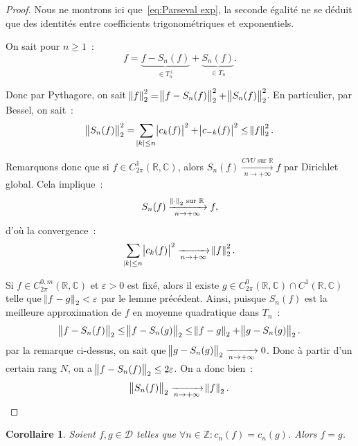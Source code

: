 \documentclass{report}
\newtheorem{cor}[thm]{Corollaire}
\theoremstyle{definition}
\theoremstyle{remark}
\numberwithin{equation}{section}
\newcommand{\C}{\mathbb C}
\newcommand{\R}{\mathbb R}
\newcommand{\Z}{\mathbb Z}
\newcommand{\CONV}[5]{\xrightarrow[#2 \to #3]{#4 \text{ #5 } #1}}
\newcommand{\CVU}[3]{\CONV{#1}{#2}{#3}{CVU}{sur}}
\newcommand{\pinfty}{{+\infty}}
\newcommand{\CmT}[2]{C^{#1,m}_{#2}}
\newcommand{\CzmT}[1]{\CmT 0{#1}}
\newcommand{\Czm}{\CzmT{2\pi}}
\begin{document}
			\begin{proof} Nous ne montrons ici que~\eqref{eq:Parseval exp}, la seconde égalité ne se déduit que des identités entre coefficients trigonométriques
			et exponentiels.

			On sait pour $n \geq 1$~:
			\begin{equation}
				f = \underbrace {f-S_n(f)}_{\in T_n^\perp} + \underbrace {S_n(f)}_{\in T_n}.
			\end{equation}

			Donc par Pythagore, on sait $\norm f_2^2 = \norm {f-S_n(f)}_2^2 + \norm {S_n(f)}_2^2$. En particulier, par Bessel, on sait~:
			\begin{equation}
				\norm {S_n(f)}_2^2 = \sum_{\abs k \leq n}\abs {c_k(f)}^2 + \abs {c_{-k}(f)}^2 \leq \norm f_2^2.
			\end{equation}

			Remarquons donc que si $f \in C^1_{2\pi}(\R, \C)$, alors $S_n(f) \CVU \R n\pinfty f$ par Dirichlet global. Cela implique~:
			\begin{equation}
				S_n(f) \xrightarrow[n \to \pinfty]{\norm \cdot_2 \text{ sur } \R} f,
			\end{equation}
			d'où la convergence~:
			\begin{equation}
				\sum_{\abs k \leq n}\abs {c_k(f)}^2 \xrightarrow[n \to \pinfty]{} \norm f_2^2.
			\end{equation}

			Si $f \in \Czm(\R, \C)$ et $\varepsilon > 0$ est fixé, alors il existe $g \in C^0_{2\pi}(\R, \C) \cap C^1(\R, \C)$ telle que $\norm {f-g}_2 < \varepsilon$
			par le lemme précédent. Ainsi, puisque $S_n(f)$ est la meilleure approximation de $f$ en moyenne quadratique dans $T_n$~:
			\begin{equation}
				\norm {f-S_n(f)}_2 \leq \norm {f-S_n(g)}_2 \leq \norm {f-g}_2 + \norm {g-S_n(g)}_2.
			\end{equation}
			par la remarque ci-dessus, on sait que $\norm {g-S_n(g)}_2 \xrightarrow[n \to \pinfty]{} 0$. Donc à partir d'un certain rang $N$, on a
			$\norm {f-S_n(f)}_2 \leq 2\varepsilon$. On a donc bien~:
			\begin{equation}
				\norm {S_n(f)}_2 \xrightarrow[n \to \pinfty]{} \norm f_2.
			\end{equation}
			\end{proof}

			\begin{cor} Soient $f, g \in \mathcal D$ telles que $\forall n \in \Z : c_n(f) = c_n(g)$. Alors $f=g$.
			\end{cor}
\end{document}
